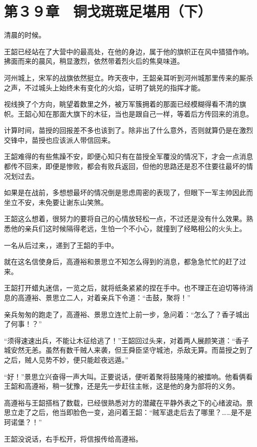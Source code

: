 \section{第３９章　铜戈斑斑足堪用（下）}

清晨的时候。

王韶已经站在了大营中的最高处，在他的身边，属于他的旗帜正在风中猎猎作响。拂面而来的晨风，稍显激烈，依然带着烈火后的焦臭味道。

河州城上，宋军的战旗依然挺立。昨天夜中，王韶亲耳听到河州城那里传来的厮杀之声，不过城头上始终未有变化的火焰，证明了姚兕的指挥才能。

视线换了个方向，眺望着数里之外，被万军簇拥着的那面已经模糊得看不清的旗帜。王韶心知在那面大旗下的木征，当也是跟自己一样，等着后方传回来的消息。

计算时间，苗授的回报差不多也该到了。除非出了什么意外，否则就算仍是在激烈交锋中，苗授也应该派人带信回来。

王韶难得的有些焦躁不安，即便心知只有在苗授全军覆没的情况下，才会一点消息都传不回来，即便是惨败，都会有败兵返回，但他的思路还是忍不住要往最坏的情况划过去。

如果是在战前，多想想最坏的情况倒是思虑周密的表现了，但眼下一军主帅因此而坐立不安，未免要让谢东山笑煞。

王韶这么想着，很努力的要将自己的心情放轻松一点，不过还是没有什么效果。熟悉他的亲兵们这时候隔得老远，生怕一个不小心，就撞到了经略相公的火头上。

一名从后过来，，递到了王韶的手中。

就在这名信使身后，高遵裕和景思立不知怎么得到的消息，都急急忙忙的赶了过来。

王韶打开蜡丸迷信，一览之后，就将纸条紧紧的捏在手中。也不理正在迫切等待消息的高遵裕、景思立二人，对着亲兵下令道：“击鼓，聚将！”

亲兵匆匆的跑走了，高遵裕、景思立连忙上前一步，急问着：“怎么了？香子城出了何事！？”

“须得速速出兵，不能让木征给逃了！”王韶回过头来，对着两人展颜笑道：“香子城安然无恙。虽然有数千贼人来袭，但王舜臣坚守城池，杀敌无算。而苗授之到了之后，贼人见势不妙，便只能趁夜远遁。”

“好！”景思立兴奋得一声大叫。正要说话，便听着聚将鼓隆隆的被擂响。他看俩看王韶和高遵裕，稍一犹豫，还是先一步赶往主帐，这是他的身为部将的义务。

高遵裕与王韶搭档了数载，已经很熟悉对方的潜藏在平静外表之下的心绪波动。景思立走了之后，他当即脸色一变，追问着王韶：“贼军退走后去了哪里？……是不是珂诺堡？！”

王韶没说话，右手松开，将信报传给高遵裕。

